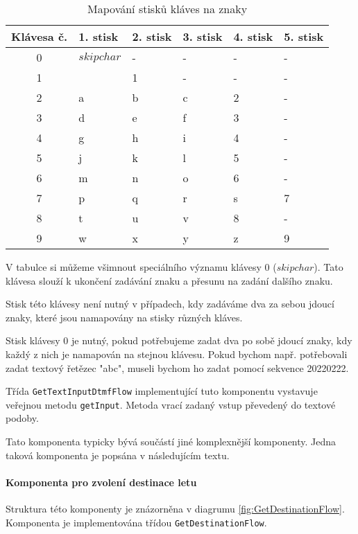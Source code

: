 \documentclass[ing,male,java,dept460,twoside]{diploma}						%
\begin{document}
\begin{table}
	\centering
	\begin{tabular}{|c|l|l|l|l|l|}
		\hline
		Klávesa č. & 1. stisk & 2. stisk & 3. stisk & 4. stisk & 5. stisk \\
		\hline
		0 & $skipchar$ & - & - & - & -  \\
		\hline
		1 & \textvisiblespace & 1 & - & - & - \\
		\hline
		2 & a & b & c & 2 & - \\
		\hline
		3 & d & e & f & 3 & - \\
		\hline
		4 & g & h & i & 4 & - \\
		\hline
		5 & j & k & l & 5 & - \\
		\hline
		6 & m & n & o & 6 & - \\
		\hline
		7 & p & q & r & s & 7 \\
		\hline
		8 & t & u & v & 8 & - \\
		\hline
		9 & w & x & y & z & 9 \\
		\hline
	\end{tabular}
	\caption{Mapování stisků kláves na znaky}
	\label{tab:GetTextInputDtmfFlow_mapping}
\end{table}

V tabulce si můžeme všimnout speciálního významu klávesy 0 ($skipchar$). Tato klávesa slouží k ukončení zadávání znaku a přesunu na zadání dalšího znaku.

Stisk této klávesy není nutný v případech, kdy zadáváme dva za sebou jdoucí znaky, které jsou namapovány na stisky různých kláves.

Stisk klávesy 0 je nutný, pokud potřebujeme zadat dva po sobě jdoucí znaky, kdy každý z nich je namapován na stejnou klávesu. Pokud bychom např. potřebovali zadat textový řetězec "abc", museli bychom ho zadat pomocí sekvence 20220222.

Třída \texttt{GetTextInputDtmfFlow} implementující tuto komponentu vystavuje veřejnou metodu \texttt{getInput}. Metoda vrací zadaný vstup převedený do textové podoby.

Tato komponenta typicky bývá součástí jiné komplexnější komponenty. Jedna taková komponenta je popsána v následujícím textu.


\paragraph{Komponenta pro zvolení destinace letu}
Struktura této komponenty je znázorněna v diagrumu \ref{fig:GetDestinationFlow}. Komponenta je implementována třídou \texttt{GetDestinationFlow}.
\end{document}
